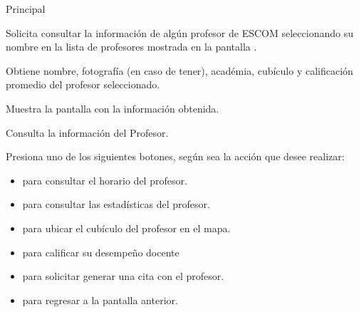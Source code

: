 \begin{UCtrayectoria}{Principal}

	\UCpaso [\UCactor] Solicita consultar la información de algún profesor de ESCOM seleccionando su nombre en la lista de profesores mostrada en la pantalla .

	\UCpaso Obtiene nombre, fotografía (en caso de tener), académia, cubículo y calificación promedio del profesor seleccionado.

	\UCpaso Muestra la pantalla  con la información obtenida.

	\UCpaso[\UCactor] Consulta la información del Profesor.

	\UCpaso [\UCactor] Presiona uno de los siguientes botones, según sea la acción que desee realizar: 
	\begin{itemize}
		\item {} para consultar el horario del profesor.
		\item {} para consultar las estadísticas del profesor.
		\item {} para ubicar el cubículo del profesor en el mapa.
		\item {} para calificar su desempeño docente
		\item {} para solicitar generar una cita con el profesor.
		\item {} para regresar a la pantalla anterior.  
	\end{itemize}

\end{UCtrayectoria}



